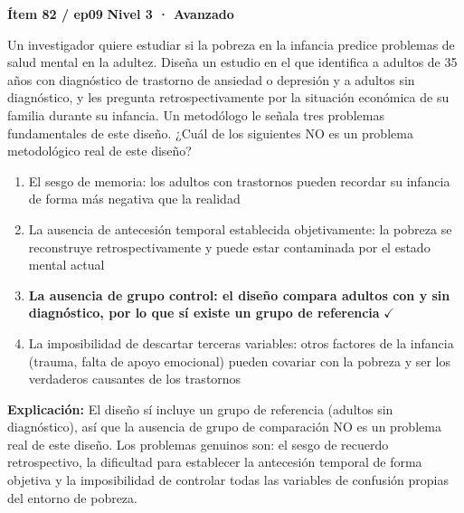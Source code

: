 \documentclass[12pt,a4paper]{article}
\begin{document}
\begin{mdframed}[backgroundcolor=fondogris,linecolor=rojo,linewidth=1pt,innerleftmargin=10pt,innerrightmargin=10pt,innertopmargin=7pt,innerbottommargin=7pt]
\textbf{Ítem 82 / ep09} \hfill {\small\bfseries\color{rojo} Nivel 3 · Avanzado}
\end{mdframed}

Un investigador quiere estudiar si la pobreza en la infancia predice problemas de salud mental en la adultez. Diseña un estudio en el que identifica a adultos de 35 años con diagnóstico de trastorno de ansiedad o depresión y a adultos sin diagnóstico, y les pregunta retrospectivamente por la situación económica de su familia durante su infancia. Un metodólogo le señala tres problemas fundamentales de este diseño. ¿Cuál de los siguientes NO es un problema metodológico real de este diseño?

\begin{enumerate}
  \item[A.] El sesgo de memoria: los adultos con trastornos pueden recordar su infancia de forma más negativa que la realidad
  \item[B.] La ausencia de antecesión temporal establecida objetivamente: la pobreza se reconstruye retrospectivamente y puede estar contaminada por el estado mental actual
  \item[\textbf{\color{verde}C.}] \textbf{\color{verde} La ausencia de grupo control: el diseño compara adultos con y sin diagnóstico, por lo que sí existe un grupo de referencia} \hfill $\checkmark$
  \item[D.] La imposibilidad de descartar terceras variables: otros factores de la infancia (trauma, falta de apoyo emocional) pueden covariar con la pobreza y ser los verdaderos causantes de los trastornos
\end{enumerate}

\noindent\textbf{\color{azul}Explicación:} El diseño sí incluye un grupo de referencia (adultos sin diagnóstico), así que la ausencia de grupo de comparación NO es un problema real de este diseño. Los problemas genuinos son: el sesgo de recuerdo retrospectivo, la dificultad para establecer la antecesión temporal de forma objetiva y la imposibilidad de controlar todas las variables de confusión propias del entorno de pobreza.
\end{document}
